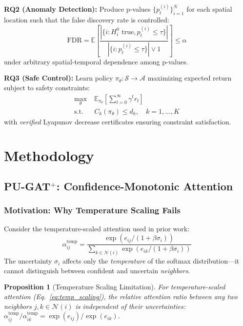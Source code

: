 \documentclass{article}
\theoremstyle{plain}
\newtheorem{proposition}[theorem]{Proposition}
\theoremstyle{definition}
\theoremstyle{remark}
\begin{document}
\textbf{RQ2 (Anomaly Detection):} Produce p-values $\{p_t^{(i)}\}_{i=1}^N$ for each spatial location such that the false discovery rate is controlled:
\begin{equation}
\text{FDR} = \mathbb{E}\left[\frac{|\{i: H_i^0 \text{ true}, p_t^{(i)} \leq \tau\}|}{|\{i: p_t^{(i)} \leq \tau\}| \vee 1}\right] \leq \alpha
\label{eq:fdr}
\end{equation}
under arbitrary spatial-temporal dependence among p-values.

\textbf{RQ3 (Safe Control):} Learn policy $\pi_\theta: \mathcal{S} \to \mathcal{A}$ maximizing expected return subject to safety constraints:
\begin{align}
\max_\theta \; & \mathbb{E}_{\pi_\theta}\left[\sum_{t=0}^\infty \gamma^t r_t\right] \label{eq:rl_obj}\\
\text{s.t.} \; & C_k(\pi_\theta) \leq d_k, \quad k = 1, \ldots, K \label{eq:rl_const}
\end{align}
with \emph{verified} Lyapunov decrease certificates ensuring constraint satisfaction.

\section{Methodology}
\label{sec:method}

\subsection{PU-GAT$^+$: Confidence-Monotonic Attention}
\label{sec:pugat}

\subsubsection{Motivation: Why Temperature Scaling Fails}

Consider the temperature-scaled attention used in prior work:
\begin{equation}
\alpha_{ij}^{\text{temp}} = \frac{\exp(e_{ij} / (1 + \beta\sigma_i))}{\sum_{k \in \mathcal{N}(i)} \exp(e_{ik} / (1 + \beta\sigma_i))}
\label{eq:temp_scaling}
\end{equation}
The uncertainty $\sigma_i$ affects only the \emph{temperature} of the softmax distribution---it cannot distinguish between confident and uncertain \emph{neighbors}.

\begin{proposition}[Temperature Scaling Limitation]
\label{prop:temp_fail}
For temperature-scaled attention (Eq.~\ref{eq:temp_scaling}), the relative attention ratio between any two neighbors $j, k \in \mathcal{N}(i)$ is independent of their uncertainties:
$\alpha_{ij}^{\text{temp}}/\alpha_{ik}^{\text{temp}} = \exp(e_{ij})/\exp(e_{ik})$.
\end{proposition}
\end{document}
